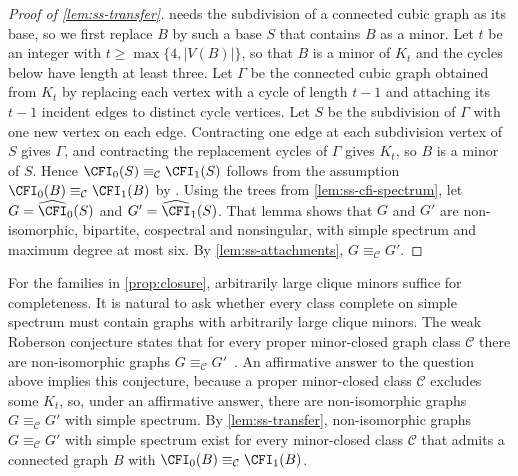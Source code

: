\begin{proof}[Proof of \cref{lem:ss-transfer}]
 needs the subdivision of a connected cubic
graph as its base, so we first replace $B$ by such a base $S$ that
contains $B$ as a minor.
Let $t$ be an integer with $t\geq\max\{4,|V(B)|\}$, so that $B$ is a minor of $K_t$ and the
cycles below have length at least three.
Let $\Gamma$ be the connected cubic graph obtained from $K_t$ by
replacing each vertex with a cycle of length $t-1$ and attaching its
$t-1$ incident edges to distinct cycle vertices.
Let $S$ be the
subdivision of $\Gamma$ with one new vertex on each edge.
Contracting one edge at each subdivision vertex of $S$ gives $\Gamma$,
and contracting the replacement cycles of $\Gamma$ gives $K_t$, so $B$
is a minor of $S$.
Hence $\CFI_0(S)\equiv_{\mathcal C}\CFI_1(S)$ follows from the
assumption $\CFI_0(B)\equiv_{\mathcal C}\CFI_1(B)$ by
\cite[Corollary~5.7]{Roberson2026}.
Using the trees from \cref{lem:ss-cfi-spectrum}, let
$G=\widehat{\CFI}_0(S)$ and $G'=\widehat{\CFI}_1(S)$.
That lemma shows that $G$ and $G'$ are non-isomorphic, bipartite,
cospectral and nonsingular, with simple spectrum and maximum degree at
most six. By \cref{lem:ss-attachments}, $G\equiv_{\mathcal C}G'$.
\end{proof}

\begin{remark}\label{rem:ss-minor-necessity}
For the families in \cref{prop:closure}, arbitrarily large clique minors
suffice for completeness.
It is natural to ask whether every class complete on simple
spectrum must contain graphs with arbitrarily large clique minors.
The weak Roberson conjecture states that for every proper minor-closed
graph class $\mathcal C$ there are non-isomorphic graphs
$G\equiv_{\mathcal C}G'$~\cite[Conjecture~5 and Theorem~8.4]{Roberson2026}.
An affirmative answer to the question above implies this conjecture,
because a proper minor-closed class $\mathcal C$ excludes some $K_t$,
so, under an affirmative answer, there are non-isomorphic graphs
$G\equiv_{\mathcal C}G'$ with simple spectrum.
By \cref{lem:ss-transfer}, non-isomorphic graphs
$G\equiv_{\mathcal C}G'$ with simple spectrum exist for every
minor-closed class $\mathcal C$ that
admits a connected graph $B$ with $\CFI_0(B)\equiv_{\mathcal C}\CFI_1(B)$.
\end{remark}
